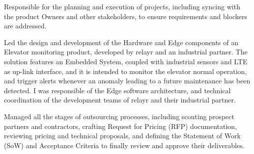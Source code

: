 \begin{cventries}
{\begin{cvitems}
        \item {Responsible for the planning and execution of projects, including syncing with the product Owners and other stakeholders, to ensure requirements and blockers are addressed.}
        \item {Led the design and development of the Hardware and Edge components of an Elevator monitoring product, developed by relayr and an industrial partner.  The solution features an Embedded System, coupled with industrial sensors and LTE as up-link interface, and it is intended to monitor the elevator normal operation, and trigger alerts whenever an anomaly leading to a future maintenance has been detected.  I was responsible of the Edge software architecture, and technical coordination of the development teams of relayr and their industrial partner.}
        \item {Managed all the stages of outsourcing processes, including scouting prospect partners and contractors, crafting Request for Pricing (RFP) documentation, reviewing pricing and technical proposals, and defining the Statement of Work (SoW) and Acceptance Criteria to finally review and approve their deliverables.}
      \end{cvitems}
    }


\end{cventries}
